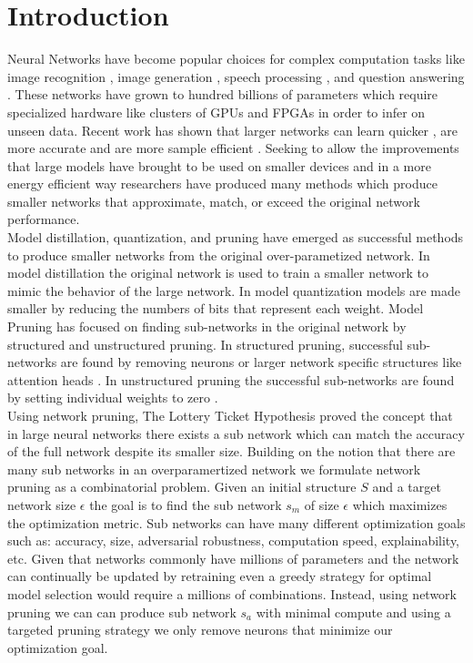 \documentclass[11pt]{article}
\begin{document}
\section{Introduction}
Neural Networks have become popular choices for complex computation tasks like image recognition \cite{Howard2017MobileNetsEC}, image generation \cite{Goodfellow2014GenerativeAN}, speech processing \cite{Zhao2017RecurrentCN}, and question answering \cite{Seo2017BidirectionalAF}. These networks have grown to hundred billions of parameters \cite{Brown2020LanguageMA} which require specialized hardware like clusters of GPUs and FPGAs in order to infer on unseen data. Recent work has shown that larger networks can learn quicker \cite{Li2020TrainLT}, are more accurate and are more sample efficient \cite{Kaplan2020ScalingLF}. Seeking to allow the improvements that large models have brought to be used on smaller devices and in a more energy efficient way researchers have produced many methods which produce smaller networks that approximate, match, or exceed the original network performance. \\ 
Model distillation, quantization, and pruning have emerged as successful methods to produce smaller networks from the original over-parametized network. In model distillation  \cite{Ba2014DoDN} the original network is used to train a smaller network to mimic the behavior of the large network. In model quantization \cite{Han2016DeepCC} models are made smaller by  reducing the numbers of bits that represent each weight. Model Pruning \cite{LeCun1989OptimalBD} has focused on finding sub-networks in the original network by structured and unstructured pruning. In structured pruning, successful sub-networks are found by removing neurons  \cite{Wang2019StructuredPF} or larger network specific structures like attention heads \cite{Voita2019AnalyzingMS}. In unstructured pruning the successful sub-networks are found by setting individual weights to zero \cite{Kwon2019StructuredCB}. \\
Using network pruning, The Lottery Ticket Hypothesis \cite{Frankle2019TheLT} proved the concept that in large neural networks there exists a sub network which can match the accuracy of the full network despite its smaller size. Building on the notion that there are many sub networks in an overparamertized network we formulate network pruning as a combinatorial problem. Given an initial structure $S$ and a target network size $\epsilon$ the goal is to find the sub network $s_m$ of size $\epsilon$ which maximizes the optimization metric. Sub networks can have many different optimization goals such as: accuracy, size, adversarial robustness, computation speed, explainability, etc. Given that networks commonly have millions of parameters and the network can continually be updated by retraining even a greedy strategy for optimal model selection would require a millions of combinations. Instead, using network pruning we can can produce sub network $s_a$ with minimal compute and using a targeted pruning strategy we only remove neurons that minimize our optimization goal. \\
\end{document}
